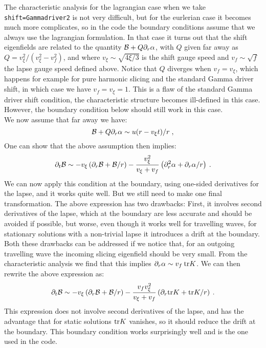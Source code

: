 \documentclass[12pt]{article}
\begin{document}
The characteristic analysis for the lagrangian case when we take
\texttt{shift=Gammadriver2} is not very difficult, but for the
eurlerian case it becomes much more complicates, so in the code the
boundary conditions assume that we always use the lagrangian
formulation. In that case it turns out that the shift eigenfields are
related to the quantity ${\cal B} + Q \partial_r \alpha$, with $Q$
given far away as $Q=v_\xi^2/(v_\xi^2 - v_f^2)$, and where $v_\xi \sim
\sqrt{4 \xi/3}$ is the shift gauge speed and $v_f \sim \sqrt{f}$ the
lapse gauge speed defined above. Notice that $Q$ diverges when $v_f =
v_\xi$, which happens for example for pure harmonic slicing and the
standard Gamma driver shift, in which case we have $v_f=v_\xi=1$.
This is a flaw of the standard Gamma driver shift condition, the
characteristic structure becomes ill-defined in this case. However,
the boundary condition below should still work in this case. \\

We now assume that far away we have:
\begin{equation}
{\cal B} + Q \partial_r \alpha \sim u(r - v_\xi t)/r \; ,
\end{equation}
One can show that the above assumption then implies:
\begin{equation}
\partial_t {\cal B} \sim - v_\xi \left( \partial_r {\cal B} + {\cal B} / r \right)
- \frac{v_\xi^2}{v_\xi + v_f} \left( \partial^2_r \alpha + \partial_r \alpha / r \right) \: .
\end{equation}
We can now apply this condition at the boundary, using one-sided
derivatives for the lapse, and it works quite well.  But we still need
to make one final transformation.  The above expression has two
drawbacks: First, it involves second derivatives of the lapse, which
at the boundary are less accurate and should be avoided if possible,
but worse, even though it works well for travelling waves, for
stationary solutions with a non-trivial lapse it introduces a drift at
the boundary.  Both these drawbacks can be addressed if we notice
that, for an outgoing travelling wave the incoming slicing eigenfield
should be very small.  From the characteristic analysis we find that
this implies $\partial_r \alpha \sim v_f \: {\rm tr} K$.  We can
then rewrite the above expression as:
\begin{equation}
\partial_t {\cal B} \sim - v_\xi \left( \partial_r {\cal B} + {\cal B} / r \right)
- \frac{v_f v_\xi^2}{v_\xi + v_f}
\left( \partial_r {\rm tr} K + {\rm tr} K / r \right) \: .
\end{equation}
This expression does not involve second derivatives of the lapse, and
has the advantage that for static solutions ${\rm tr} K$ vanishes, so
it should reduce the drift at the boundary. This boundary condition
works surprisingly well and is the one used in the code.
\end{document}
